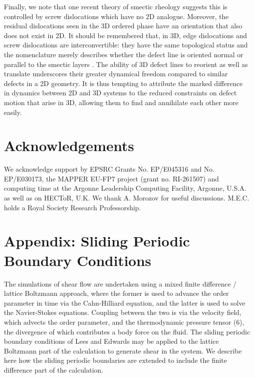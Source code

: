 \documentclass[8.5pt,twoside,twocolumn]{article}
\begin{document}
Finally, we note that one recent theory of smectic rheology \cite{Lu08} suggests this is controlled by screw dislocations which have no 2D analogue. Moreover, the residual dislocations seen in the 3D ordered phase have an orientation that also does not exist in 2D. It should be remembered that, in 3D, edge dislocations and screw dislocations are interconvertible: they have the same topological status and the nomenclature merely describes whether the defect line is oriented normal or parallel to the smectic layers \cite{ChaikinLubensky}. The ability of 3D defect lines to reorient as well as translate underscores their greater dynamical freedom compared to similar defects in a 2D geometry. It is thus tempting to attribute the marked difference in dynamics between 2D and 3D systems to the reduced constraints on defect motion that arise in 3D, allowing them to find and annihilate each other more easily.



\section{Acknowledgements}
We acknowledge support by EPSRC Grants No. EP/E045316 and No. EP/E030173, the MAPPER EU-FP7 project (grant no. RI-261507) and computing time at the Argonne Leadership Computing Facility, Argonne, U.S.A. as well as on HECToR, U.K.
We thank A. Morozov for useful discussions. 
M.E.C. holds a Royal Society Research Professorship.

\section{Appendix: Sliding Periodic Boundary Conditions}

The simulations of shear flow are undertaken using a mixed finite
difference / lattice Boltzmann approach, where the former is used
to advance the order parameter in time via the Cahn-Hilliard equation,
and the latter is used to solve the Navier-Stokes equations.
Coupling between the two is
via the velocity field, which advects the order parameter, and
the thermodynamic pressure tensor (6), the divergence of which
contributes a body force on the fluid. The sliding periodic
boundary conditions of Lees and Edwards\cite{leesedwards} may be
applied to the lattice Boltzmann part of the calculation
\cite{Wagner02,Adhikari05} to generate shear in the system. We
describe here how the sliding periodic boundaries are extended to
include the finite difference part of the calculation.
\end{document}

